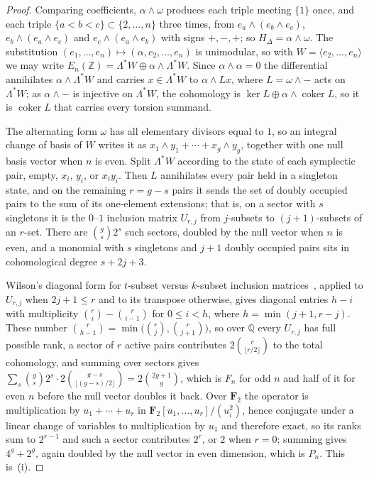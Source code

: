 \documentclass[11pt]{article}
\theoremstyle{definition}
\newcommand{\Z}{\mathbb Z}
\providecommand{\Z}{\mathbb Z}
\begin{document}
\begin{proof}
Comparing coefficients, $\alpha\wedge\omega$ produces each triple meeting $\{1\}$ once, and each triple $\{a<b<c\}\subset\{2,\ldots,n\}$ three times, from $e_a\wedge(e_b\wedge e_c)$, $e_b\wedge(e_a\wedge e_c)$ and $e_c\wedge(e_a\wedge e_b)$ with signs $+,-,+$; so $H_\Delta=\alpha\wedge\omega$.  The substitution $(e_1,\ldots,e_n)\mapsto(\alpha,e_2,\ldots,e_n)$ is unimodular, so with $W=\langle e_2,\ldots,e_n\rangle$ we may write $E_n(\Z)=\Lambda^{*}W\oplus\alpha\wedge\Lambda^{*}W$.  Since $\alpha\wedge\alpha=0$ the differential annihilates $\alpha\wedge\Lambda^{*}W$ and carries $x\in\Lambda^{*}W$ to $\alpha\wedge Lx$, where $L=\omega\wedge-$ acts on $\Lambda^{*}W$; as $\alpha\wedge-$ is injective on $\Lambda^{*}W$, the cohomology is $\ker L\oplus\alpha\wedge\operatorname{coker}L$, so it is $\operatorname{coker}L$ that carries every torsion summand.

The alternating form $\omega$ has all elementary divisors equal to $1$, so an integral change of basis of $W$ writes it as $x_1\wedge y_1+\cdots+x_g\wedge y_g$, together with one null basis vector when $n$ is even.  Split $\Lambda^{*}W$ according to the state of each symplectic pair, empty, $x_i$, $y_i$, or $x_iy_i$.  Then $L$ annihilates every pair held in a singleton state, and on the remaining $r=g-s$ pairs it sends the set of doubly occupied pairs to the sum of its one-element extensions; that is, on a sector with $s$ singletons it is the $0$--$1$ inclusion matrix $U_{r,j}$ from $j$-subsets to $(j+1)$-subsets of an $r$-set.  There are $\binom gs2^{s}$ such sectors, doubled by the null vector when $n$ is even, and a monomial with $s$ singletons and $j+1$ doubly occupied pairs sits in cohomological degree $s+2j+3$.

Wilson's diagonal form for $t$-subset versus $k$-subset inclusion matrices~\cite{Wil90}, applied to $U_{r,j}$ when $2j+1\le r$ and to its transpose otherwise, gives diagonal entries $h-i$ with multiplicity $\binom ri-\binom r{i-1}$ for $0\le i<h$, where $h=\min(j+1,r-j)$.  These number $\binom r{h-1}=\min\bigl(\binom rj,\binom r{j+1}\bigr)$, so over $\mathbb Q$ every $U_{r,j}$ has full possible rank, a sector of $r$ active pairs contributes $2\binom r{\lfloor r/2\rfloor}$ to the total cohomology, and summing over sectors gives $\sum_s\binom gs2^{s}\cdot2\binom{g-s}{\lfloor(g-s)/2\rfloor}=2\binom{2g+1}g$, which is $F_n$ for odd $n$ and half of it for even $n$ before the null vector doubles it back.  Over $\mathbf F_2$ the operator is multiplication by $u_1+\cdots+u_r$ in $\mathbf F_2[u_1,\ldots,u_r]/(u_i^2)$, hence conjugate under a linear change of variables to multiplication by $u_1$ and therefore exact, so its ranks sum to $2^{r-1}$ and such a sector contributes $2^{r}$, or $2$ when $r=0$; summing gives $4^{g}+2^{g}$, again doubled by the null vector in even dimension, which is $P_n$.  This is~(i).


\end{proof}
\end{document}
